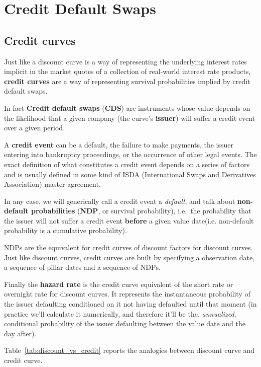 \chapter{Credit Default Swaps}\label{credit_default_swaps}

\section{Credit curves}\label{credit-curves}

Just like a discount curve is a way of representing the underlying
interest rates implicit in the market quotes of a collection of
real-world interest rate products, \textbf{credit curves} are a way of
representing survival probabilities implied by credit default swaps.

In fact \textbf{Credit default swaps} (\textbf{CDS}) are instruments whose value
depends on the likelihood that a given company (the curve's
\textbf{issuer}) will suffer a credit event over a given period.

A \textbf{credit event} can be a default, the failure to make payments,
the issuer entering into bankruptcy proceedings, or the occurrence of
other legal events. The exact definition of what constitutes a credit
event depends on a series of factors and is usually defined in some kind
of ISDA (International Swaps and Derivatives Association) master
agreement.

In any case, we will generically call a credit event a \emph{default},
and talk about \textbf{non-default probabilities} (\textbf{NDP}, or
survival probability), i.e.~the probability that the issuer will
not suffer a credit event \textbf{before} a given value date(i.e. non-default probability is a cumulative probability).

NDPs are the equivalent for credit curves of discount factors for
discount curves. Just like discount curves, credit curves are built by
specifying a observation date, a sequence of pillar dates and a
sequence of NDPs. 

Finally the \textbf{hazard rate} is the credit curve
equivalent of the short rate or overnight rate for discount curves. It
represents the instantaneous probability of the issuer defaulting
conditioned on it not having defaulted until that moment (in
practice we'll calculate it numerically, and therefore it'll be the, \emph{annualized}, conditional probability of the issuer defaulting between
the value date and the day after).

Table~\ref{tab:discount_vs_credit} reports the analogies between discount curve and credit curve.

